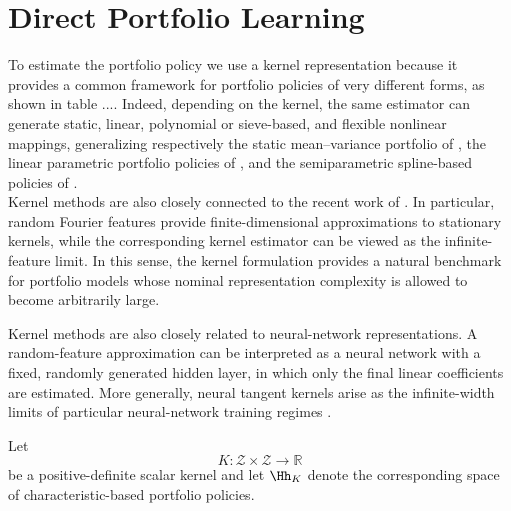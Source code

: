 \section{Direct Portfolio Learning}
\label{sec:direct_learning}
To estimate the portfolio policy we use a kernel representation \citet{filipovicschneider2024,nagel2025} because it provides a common framework for
portfolio policies of very different forms, as shown in table .... 
Indeed, depending on the kernel, the same estimator can generate static, linear,
polynomial or sieve-based, and flexible nonlinear mappings, generalizing respectively the static mean--variance portfolio of \citet{brittenjones1999}, the linear parametric portfolio
policies of \citet{brandtsantaclaravalkanov2009}, and the semiparametric
spline-based policies of \citet{caldeirasantostorrent2023}.\\
Kernel methods are also closely connected to the recent work of
\citet{nagel2025,kellymalamud2025}. In particular, random Fourier features
\citep{rahimi2007random} provide finite-dimensional approximations to
stationary kernels, while the corresponding kernel estimator can be viewed as
the infinite-feature limit. In this sense, the kernel formulation provides a
natural benchmark for portfolio models whose nominal representation complexity
is allowed to become arbitrarily large.

Kernel methods are also closely related to neural-network representations.
A random-feature approximation can be interpreted as a neural network with a
fixed, randomly generated hidden layer, in which only the final linear
coefficients are estimated. More generally, neural tangent kernels arise as
the infinite-width limits of particular neural-network training regimes
\citep{jacot2018neural}.

Let
\[
K:\mathscr Z\times\mathscr Z\rightarrow\mathbb R
\]
be a positive-definite scalar kernel and let $\Hh_K$ denote the corresponding
space of characteristic-based portfolio policies.

